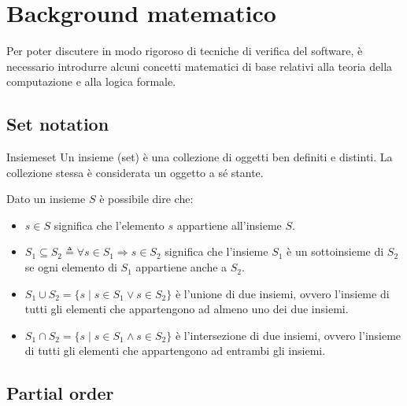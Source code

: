 \section{Background matematico}
Per poter discutere in modo rigoroso di tecniche di verifica del software,
è necessario introdurre alcuni concetti matematici di base relativi alla
teoria della computazione e alla logica formale.

\subsection{Set notation}
\begin{definizione}{Insieme}{set}
Un insieme (set) è una collezione di oggetti ben definiti e distinti.
La collezione stessa è considerata un oggetto a sé stante.

Dato un insieme $S$ è possibile dire che:
\begin{itemize}
    \item $s \in S$ significa che l'elemento $s$ appartiene all'insieme $S$.
    \item $S_{1}\subseteq S_{2}\triangleq\forall s\in S_{1}\Rightarrow s\in S_{2}$
    significa che l'insieme $S_{1}$ è un sottoinsieme di $S_{2}$ se ogni
    elemento di $S_{1}$ appartiene anche a $S_{2}$.
    \item $S_{1}\cup S_{2}=\{s \mid s\in S_{1}\vee s\in S_{2}\}$ è l'unione di
    due insiemi, ovvero l'insieme di tutti gli elementi che appartengono
    ad almeno uno dei due insiemi.
    \item $S_{1}\cap S_{2}=\{s \mid s\in S_{1}\wedge s\in S_{2}\}$ è l'intersezione
    di due insiemi, ovvero l'insieme di tutti gli elementi che appartengono
    ad entrambi gli insiemi.
\end{itemize}
\end{definizione}


\subsection{Partial order}


